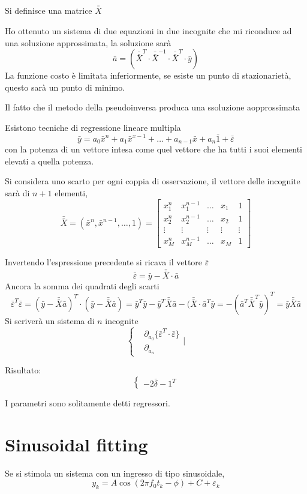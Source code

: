 Si definisce una matrice
$\bar{\bar{X}}$

Ho ottenuto un sistema di due equazioni in due incognite che mi riconduce ad
una soluzione approssimata, la soluzione sarà
$$
\bar{a} = (\bar{\bar{X}}^T\cdot \bar{\bar{X}}^{-1}\cdot \bar\bar{{X}}^T \cdot
\bar{y})
$$
La funzione costo è limitata inferiormente, se esiste un punto di
stazionarietà, questo sarà un punto di minimo.

Il fatto che il metodo della pseudoinversa produca una ssoluzione aopprossimata



Esistono tecniche di regressione lineare multipla
$$
\bar{y} = a_0\bar{x}^n + a_1\bar{x}^{x-1} + \dots + a_{n-1}\bar{x} + a_n\bar{1}
+ \bar{\varepsilon}
$$
con la potenza di un vettore intesa come quel vettore che ha tutti i suoi
elementi elevati a quella potenza.

Si considera uno scarto per ogni coppia di osservazione, il vettore delle
incognite sarà di $n+1$ elementi,
$$
\bar{\bar{X}} = (\bar{x}^n, \bar{x}^{n-1},\dots,1) = \begin{bmatrix}
x_1^n & x_1^{n-1} & \dots &x_1 & 1 \\
x_2^n & x_2^{n-1} & \dots & x_2 & 1 \\
\vdots & \vdots & \vdots &\vdots & \vdots \\
x_M^{n} & x_M^{n-1} & \dots & x_M & 1
\end{bmatrix}
$$

Invertendo l'espressione precedente si ricava il vettore $\bar{\varepsilon}$
$$
\bar{\varepsilon} = \bar{y}-\bar{\bar{X}}\cdot\bar{a}
$$
Ancora la somma dei quadrati degli scarti
$$
\bar{\varepsilon}^T\bar{\varepsilon} =
(\bar{y}-\bar{\bar{X}}\bar{a})^T\cdot(\bar{y}-\bar{\bar{X}}\bar{a}) =
\bar{y}^T\bar{y} - \bar{y}^T\bar{\bar{X}}\bar{a} -
(\bar{\bar{X}}\cdot\bar{a}^T\bar{y} = - (\bar{a}^T\bar{\bar{X}}^T\bar{y})^T =
\bar{y}\bar{\bar{X}}\bar{a}
$$
Si scriverà un sistema di $n$ incognite
$$\begin{cases}
&\partial_{a_0}\{\bar{\varepsilon}^T\cdot \bar{\varepsilon}\} \\
& \partial_{a_n}
\end{cases} |
$$

Risultato:
$$
\begin{cases}
-2\bar{\delta}-1^T
\end{cases}
$$


I parametri sono solitamente detti regressori.

\section{Sinusoidal fitting}
Se si stimola un sistema con un ingresso di tipo sinusoidale,
$$
y_k = A\cos(2\pi f_0t_k - \phi) + C + \varepsilon_k
$$

